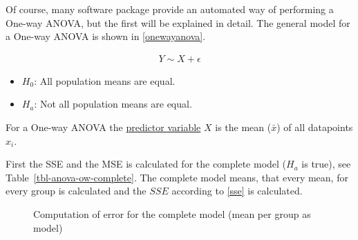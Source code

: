 \documentclass[
  a4paper,
]{scrbook}
\providecommand{\tightlist}{%
  \setlength{\itemsep}{0pt}\setlength{\parskip}{0pt}}\usepackage{longtable,booktabs,array}
\begin{document}
Of course, many software package provide an automated way of performing
a One-way ANOVA, but the first will be explained in detail. The general
model for a One-way ANOVA is shown in \eqref{onewayanova}.

\begin{align}
Y \sim X + \epsilon \label{onewayanova}
\end{align}

\begin{itemize}
\tightlist
\item
  \(H_0\): All population means are equal.
\item
  \(H_a\): Not all population means are equal.
\end{itemize}

For a One-way ANOVA the \hyperref[X]{predictor variable} \(X\) is the
mean (\(\bar{x}\)) of all datapoints \(x_i\).

First the SSE and the MSE is calculated for the complete model (\(H_a\)
is true), see Table~\ref{tbl-anova-ow-complete}. The complete model
means, that every mean, for every group is calculated and the
\hyperref[sse]{\(SSE\)} according to \eqref{sse} is calculated.

\begin{figure}[ht]


\caption{\label{fig-anova-mdls-comp}Computation of error for the
complete model (mean per group as model)}

\end{figure}%
\end{document}

